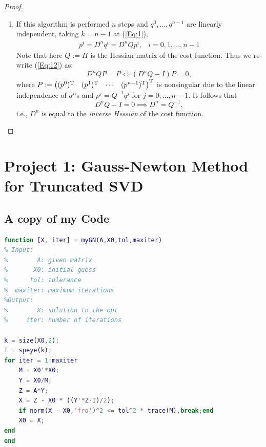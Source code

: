 \begin{enumerate}
\begin{proof}
\begin{enumerate}
\begin{itemize}
\begin{enumerate}
\begin{align}
&=0,\label{Eq:11}
\end{align}
where (\ref{Eq:8}) is due to the update formula (\ref{Eq:7}); (\ref{Eq:10}) is due to the formula $y^k=p^k-D^kq^k$; (\ref{Eq:11}) is due to the formula in (i)
\end{enumerate}
Combining (i) and (ii), the proof in (a) is complete.
\end{itemize}
\item
If this algorithm is performed $n$ steps and $q^0,\dots,q^{n-1}$ are linearly independent, taking $k=n-1$ at (\ref{Eq:1}),
\begin{equation}\label{Eq:12}
\begin{array}{ll}
p^i = D^{n}q^i=D^{n}Qp^i,
&
i=0,1,\dots,n-1
\end{array}
\end{equation}
Note that here $Q:=H$ is the Hessian matrix of the cost function. Thus we re-write (\ref{Eq:12}) as:
\[
D^nQP=P\Longleftrightarrow
(D^nQ-I)P=0,
\]
where $P:=\begin{pmatrix}
(p^0)^{\mathrm T}&(p^1)^{\mathrm T}&\cdots&(p^{n-1})^{\mathrm T}
\end{pmatrix}^{\mathrm T}$ is nonsingular due to the linear independence of $q^{j}$'s and $p^j=Q^{-1}q^j$ for $j=0,\dots,n-1$. It follows that
\[
D^nQ-I=0\implies D^n=Q^{-1},
\]
i.e., $D^n$ is equal to the \emph{inverse Hessian} of the cost function.
\end{enumerate}
\end{proof}
\end{enumerate}
\clearpage
\section*{Project 1:
Gauss-Newton Method for Truncated SVD}

\subsection*{A copy of my Code}
\begin{lstlisting}[language=matlab]
function [X, iter] = myGN(A,X0,tol,maxiter)
% Input:
%        A: given matrix
%       X0: initial guess
%      tol: tolerance
%  maxiter: maximum iterations
%Output:
%        X: solution to the opt
%     iter: number of iterations

k = size(X0,2);
I = speye(k);
for iter = 1:maxiter
    M = X0'*X0;
    Y = X0/M;
    Z = A*Y;
    X = Z - X0 * ((Y'*Z-I)/2);
    if norm(X - X0,'fro')^2 <= tol^2 * trace(M),break;end
    X0 = X;
end
end
\end{lstlisting}
